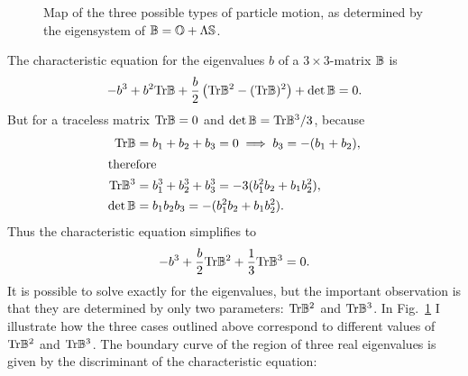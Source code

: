 \documentclass[thesis.tex]{subfiles}
\begin{document}
\begin{figure}
\begin{center}
\end{center}
\caption{\label{fig:bmap}  Map of the three possible types of particle motion, as determined by the eigensystem of $\mathbb{B}=\mathbb{O} + \Lambda \mathbb{S}$.}%
\end{figure}
The characteristic equation for the eigenvalues $b$ of a $3\times3$-matrix $\mathbb{B}$ is
\begin{align*}
	-b^3 + b^2\mbox{Tr} \mathbb{B}  + \frac{b}{2}\left(\mbox{Tr} \mathbb{B}^2-(\mbox{Tr} \mathbb{B})^2\right)+\det\mathbb{B} = 0.
\end{align*}
But for a traceless matrix $\mbox{Tr} \mathbb{B}=0$ and $\det \mathbb{B} = \mbox{Tr}\mathbb{B}^3/3$, because
\begin{align*}
	\mbox{Tr} \mathbb{B} &= b_1 + b_2 + b_3 = 0 \implies b_3 = -(b_1 + b_2),\\
	\intertext{therefore}
	\mbox{Tr} \mathbb{B}^3 &= b_1^3 + b_2^3 + b_3^3 = -3(b_1^2b_2 + b_1b_2^2),\\
	\det \mathbb{B} &= b_1b_2b_3 = -(b_1^2b_2 + b_1b_2^2).
\end{align*}
Thus the characteristic equation simplifies to
\begin{align}
	-b^3 + \frac{b}{2}\tr \ma B^2 +\frac{1}{3}\tr\ma B^3 = 0. \eqnlab{bcharacteristic}
\end{align}
It is possible to solve exactly for the eigenvalues, but the important observation is that they are determined by only two parameters: $\mbox{Tr} \mathbb{B}^2$ and $\mbox{Tr}\mathbb{B}^3$. In Fig.~\ref{fig:bmap} I illustrate how the three cases outlined above correspond to different values of $\mbox{Tr} \mathbb{B}^2$ and $\mbox{Tr}\mathbb{B}^3$. The boundary curve of the region of three real eigenvalues is given by the discriminant of the characteristic equation:
\end{document}
